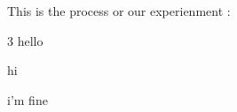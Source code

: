 This is the process or our experienment :
\begin{multicols}{3}
hello

\columnbreak
\lipsum[2]
hi

\columnbreak
\lipsum[2]
i'm fine
\end{multicols}
